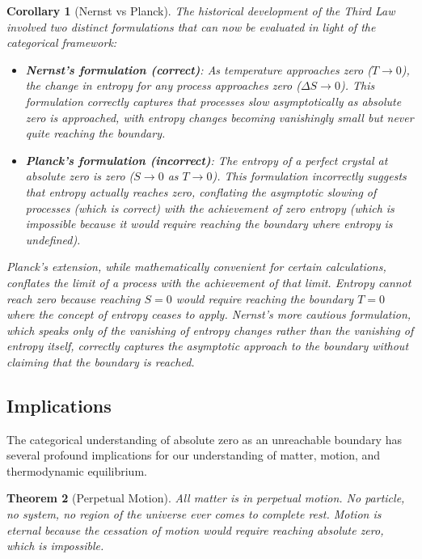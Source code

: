 \documentclass[12pt,a4paper]{article}
\newtheorem{theorem}{Theorem}[section]
\newtheorem{corollary}[theorem]{Corollary}
\theoremstyle{definition}
\theoremstyle{remark}
\begin{document}
\begin{corollary}[Nernst vs Planck]
The historical development of the Third Law involved two distinct formulations that can now be evaluated in light of the categorical framework:
\begin{itemize}
    \item \textbf{Nernst's formulation (correct)}: As temperature approaches zero ($T \to 0$), the change in entropy for any process approaches zero ($\Delta S \to 0$). This formulation correctly captures that processes slow asymptotically as absolute zero is approached, with entropy changes becoming vanishingly small but never quite reaching the boundary.
    
    \item \textbf{Planck's formulation (incorrect)}: The entropy of a perfect crystal at absolute zero is zero ($S \to 0$ as $T \to 0$). This formulation incorrectly suggests that entropy actually reaches zero, conflating the asymptotic slowing of processes (which is correct) with the achievement of zero entropy (which is impossible because it would require reaching the boundary where entropy is undefined).
\end{itemize}
Planck's extension, while mathematically convenient for certain calculations, conflates the limit of a process with the achievement of that limit. Entropy cannot reach zero because reaching $S = 0$ would require reaching the boundary $T = 0$ where the concept of entropy ceases to apply. Nernst's more cautious formulation, which speaks only of the vanishing of entropy changes rather than the vanishing of entropy itself, correctly captures the asymptotic approach to the boundary without claiming that the boundary is reached.
\end{corollary}

\subsection{Implications}

The categorical understanding of absolute zero as an unreachable boundary has several profound implications for our understanding of matter, motion, and thermodynamic equilibrium.

\begin{theorem}[Perpetual Motion]
\label{thm:perpetual_motion}
All matter is in perpetual motion. No particle, no system, no region of the universe ever comes to complete rest. Motion is eternal because the cessation of motion would require reaching absolute zero, which is impossible.
\end{theorem}
\end{document}
